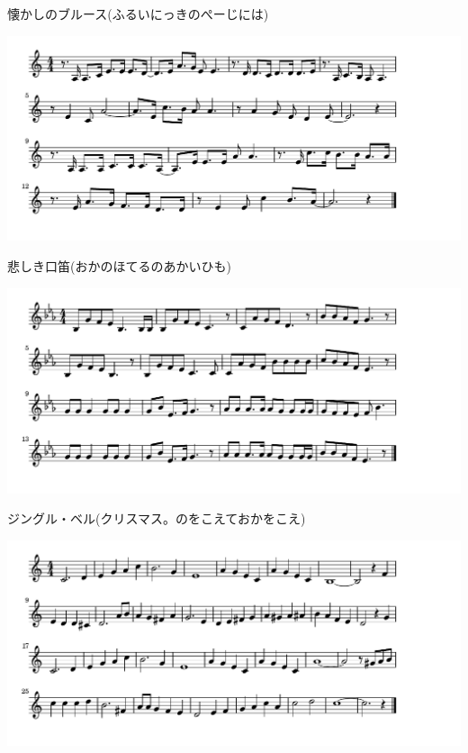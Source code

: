 \documentclass[a4paper]{ltjsarticle}
\begin{document}
\vspace{-10mm} \hspace{10mm}
懐かしのブルース(ふるいにっきのぺーじには)

\includegraphics[clip]{kanashikikuchibue_crop.pdf}

\vspace{-10mm} \hspace{10mm}
悲しき口笛(おかのほてるのあかいひも)


\includegraphics[clip]{jinglebell_crop.pdf}

\vspace{-10mm} \hspace{10mm}
ジングル・ベル(クリスマス。のをこえておかをこえ)

\includegraphics[clip]{mommykisssanta_crop.pdf}
\end{document}
